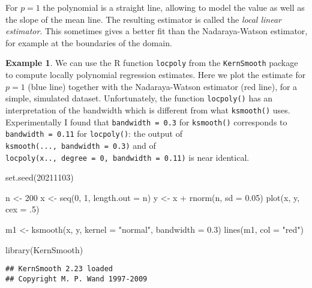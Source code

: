 \documentclass[
  a4paper,
]{article}
\newenvironment{Shaded}{\begin{snugshade}}{\end{snugshade}}
\newcommand{\AttributeTok}[1]{\textcolor[rgb]{0.77,0.63,0.00}{#1}}
\newcommand{\DecValTok}[1]{\textcolor[rgb]{0.00,0.00,0.81}{#1}}
\newcommand{\FloatTok}[1]{\textcolor[rgb]{0.00,0.00,0.81}{#1}}
\newcommand{\FunctionTok}[1]{\textcolor[rgb]{0.00,0.00,0.00}{#1}}
\newcommand{\NormalTok}[1]{#1}
\newcommand{\OtherTok}[1]{\textcolor[rgb]{0.56,0.35,0.01}{#1}}
\newcommand{\SpecialCharTok}[1]{\textcolor[rgb]{0.00,0.00,0.00}{#1}}
\newcommand{\StringTok}[1]{\textcolor[rgb]{0.31,0.60,0.02}{#1}}
\theoremstyle{definition}
\theoremstyle{definition}
\newtheorem{example}{Example}[section]
\theoremstyle{definition}
\theoremstyle{definition}
\theoremstyle{remark}
\begin{document}
For \(p=1\) the polynomial is a straight line, allowing to model the
value as well as the slope of the mean line. The resulting estimator
is called the \emph{local linear estimator}.
This sometimes gives
a better fit than the Nadaraya-Watson estimator, for example at the boundaries
of the domain.

\begin{example}
We can use the R function \texttt{locpoly} from the \texttt{KernSmooth} package to
compute locally polynomial regression estimates. Here we plot
the estimate for \(p=1\) (blue line) together with the Nadaraya-Watson
estimator (red line), for a simple, simulated dataset.
Unfortunately, the function \texttt{locpoly()} has an interpretation of the bandwidth
which is different from what \texttt{ksmooth()} uses. Experimentally I found
that \texttt{bandwidth\ =\ 0.3} for \texttt{ksmooth()} corresponds to
\texttt{bandwidth\ =\ 0.11} for \texttt{locpoly()}: the output of
\texttt{ksmooth(...,\ bandwidth\ =\ 0.3)}
and of \texttt{locpoly(x..,\ degree\ =\ 0,\ bandwidth\ =\ 0.11)} is near identical.

\begin{Shaded}
\begin{Highlighting}[]
\FunctionTok{set.seed}\NormalTok{(}\DecValTok{20211103}\NormalTok{)}

\NormalTok{n }\OtherTok{\textless{}{-}} \DecValTok{200}
\NormalTok{x }\OtherTok{\textless{}{-}} \FunctionTok{seq}\NormalTok{(}\DecValTok{0}\NormalTok{, }\DecValTok{1}\NormalTok{, }\AttributeTok{length.out =}\NormalTok{ n)}
\NormalTok{y }\OtherTok{\textless{}{-}}\NormalTok{ x }\SpecialCharTok{+} \FunctionTok{rnorm}\NormalTok{(n, }\AttributeTok{sd =} \FloatTok{0.05}\NormalTok{)}
\FunctionTok{plot}\NormalTok{(x, y, }\AttributeTok{cex =}\NormalTok{ .}\DecValTok{5}\NormalTok{)}

\NormalTok{m1 }\OtherTok{\textless{}{-}} \FunctionTok{ksmooth}\NormalTok{(x, y, }\AttributeTok{kernel =} \StringTok{"normal"}\NormalTok{, }\AttributeTok{bandwidth =} \FloatTok{0.3}\NormalTok{)}
\FunctionTok{lines}\NormalTok{(m1, }\AttributeTok{col =} \StringTok{"red"}\NormalTok{)}

\FunctionTok{library}\NormalTok{(KernSmooth)}
\end{Highlighting}
\end{Shaded}

\begin{verbatim}
## KernSmooth 2.23 loaded
## Copyright M. P. Wand 1997-2009
\end{verbatim}


\end{example}
\end{document}
